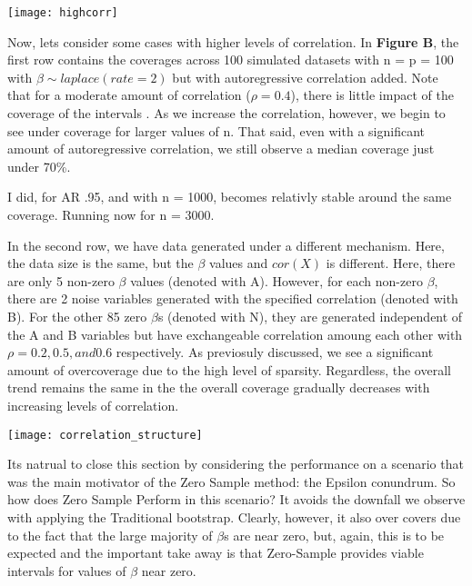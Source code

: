 \texttt{[image: highcorr]}

Now, lets consider some cases with higher levels of correlation. In \textbf{Figure B}, the first row contains the coverages across 100 simulated datasets with n = p = 100 with $\beta \sim laplace(rate = 2)$ but with autoregressive correlation added. Note that for a moderate amount of correlation ($\rho = 0.4$), there is little impact of the coverage of the intervals . As we increase the correlation, however, we begin to see under coverage for larger values of n. That said, even with a significant amount of autoregressive correlation, we still observe a median coverage just under 70\%.


I did, for AR .95, and with n = 1000, becomes relativly stable around the same coverage. Running now for n = 3000.


In the second row, we have data generated under a different mechanism. Here, the data size is the same, but the $\beta$ values and $cor(X)$ is different. Here, there are only 5 non-zero $\beta$ values (denoted with A). However, for each non-zero $\beta$, there are 2 noise variables generated with the specified correlation (denoted with B). For the other 85 zero $\beta$s (denoted with N), they are generated independent of the A and B variables but have exchangeable correlation amoung each other with $\rho = 0.2, 0.5, and 0.6$ respectively. As previosuly discussed, we see a significant amount of overcoverage due to the high level of sparsity. Regardless, the overall trend remains the same in the the overall coverage gradually decreases with increasing levels of correlation.


\texttt{[image: correlation\_structure]}

Its natrual to close this section by considering the performance on a scenario that was the main motivator of the Zero Sample method: the Epsilon conundrum. So how does Zero Sample Perform in this scenario? It avoids the downfall we observe with applying the Traditional bootstrap. Clearly, however, it also over covers due to the fact that the large majority of $\beta$s are near zero, but, again, this is to be expected and the important take away is that Zero-Sample provides viable intervals for values of $\beta$ near zero.

